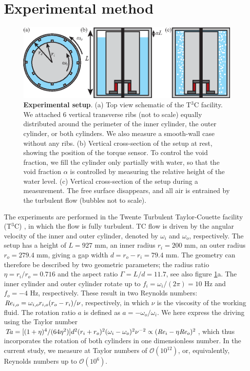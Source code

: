 \documentclass{jfm}
\renewcommand{\Re}{\Rey}
\newcommand{\Ta}{T\!a}
\begin{document}
\section{Experimental method}
\begin{figure}
\centering
\includegraphics[width = 1.0\linewidth]{fig1}
\caption{{\bf Experimental setup}.  (a) Top view schematic of the T$^3$C facility. We attached 6 vertical transverse ribs (not to scale) equally distributed around the perimeter of the inner cylinder, the outer cylinder, or both cylinders. We also measure a smooth-wall case without any ribs. (b) Vertical cross-section of the setup at rest, showing the position of the torque sensor. To control the void fraction, we fill the cylinder only partially with water, so that the void fraction $\alpha$ is controlled by measuring the relative height of the water level. (c) Vertical cross-section of the setup during a measurement. The free surface disappears, and all air is entrained by the turbulent flow (bubbles not to scale). }
\label{Chap_Seven_fig:setup}
\end{figure}
The experiments are performed in the Twente Turbulent Taylor-Couette facility (T$^3$C) \citep{gil11a}, in which the flow is fully turbulent. TC flow is driven by the angular velocity of the inner and outer cylinder, denoted by $\omega_i$ and $\omega_o$, respectively.
The setup has a height of $L=927$ mm, an inner radius $r_i=200$ mm, an outer radius $r_o=279.4$ mm, giving a gap width $d=r_o-r_i=79.4$ mm. The geometry can therefore be described by two geometric parameters; the radius ratio $\eta=r_i/r_o=0.716$  and the aspect ratio $\Gamma = L/d = 11.7$, see also figure \ref{Chap_Seven_fig:setup}a. 
The inner cylinder and outer cylinder rotate up to $f_i=\omega_i/(2\pi) =  10$ Hz and $f_o = -4$ Hz, respectively. 
These result in two Reynolds numbers: $\Re_{i,o} = \omega_{i,o} r_{i,o} (r_o-r_i)/\nu$, respectively, in which $\nu$ is the viscosity of the working fluid.  The rotation ratio $a$ is defined as $a=-\omega_o/\omega_i$. We here express the driving using the Taylor number $\Ta = [(1+\eta)^4/(64\eta^2)]d^2 (r_i+r_o)^2( \omega_i-\omega_o)^2\nu^{-2} \propto (\Re_i - \eta \Re_o)^2$, which thus incorporates the rotation of both cylinders in one dimensionless number. In the current study, we measure at Taylor numbers of $\mathcal{O}(10^{12})$, or, equivalently, Reynolds numbers up to $\mathcal{O}(10^6)$. 
\end{document}

